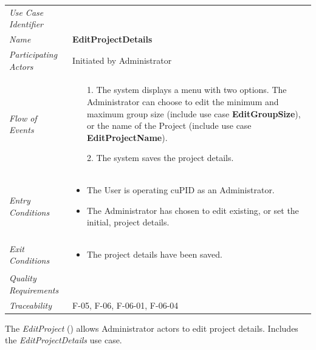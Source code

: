 \documentclass[12pt,letterpaper]{article}
\begin{document}
\begin{center}
	\begin{tabu} to 
		\toprule
		Use Case Identifier &  \\
		Name & {\bf EditProjectDetails} \\
		Participating Actors & Initiated by Administrator \\
		Flow of Events & 
		\begin{minipage}[t]{\linewidth}
		    \begin{enumerate}
			    \item[1.] The system displays a menu with two options. The Administrator can choose to edit the minimum and maximum group size (include use case \textbf{EditGroupSize}), or the name of the Project (include use case \textbf{EditProjectName}).
			    \item[2.] The system saves the project details.
			\end{enumerate}
		\end{minipage} \\

		Entry Conditions &
		\begin{minipage}[t]{\linewidth}
			\begin{itemize}
			    \item The User is operating cuPID as an Administrator.
			    \item The Administrator has chosen to edit existing, or set the initial, project details.
	        \end{itemize}
		\end{minipage} \\

		Exit Conditions &
		\begin{minipage}[t]{\linewidth}
			\begin{itemize}
			    \item The project details have been saved.
	        \end{itemize}
		\end{minipage} \\


		Quality Requirements & \\

		Traceability & F-05, F-06, F-06-01, F-06-04 \\
		\toprule
	\end{tabu}
\end{center}

\vspace{1em}
The {\it EditProject} () allows Administrator actors to edit project details. Includes the {\it EditProjectDetails} use case.
\end{document}

